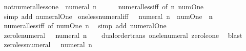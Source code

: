 \begin{isabellebody}
\isanewline
%
\endisadelimproof
\isanewline
{}\isamarkupfalse%
\ not{\isacharunderscore}{\kern0pt}numeral{\isacharunderscore}{\kern0pt}less{\isacharunderscore}{\kern0pt}one{\isacharcolon}{\kern0pt}\ {\isachardoublequoteopen}{\isasymnot}\ numeral\ n\ {\isacharless}{\kern0pt}\ {}{\isachardoublequoteclose}\isanewline
%
\isadelimproof
\ \ %
\endisadelimproof
%
\isatagproof
{}\isamarkupfalse%
\ numeral{\isacharunderscore}{\kern0pt}less{\isacharunderscore}{\kern0pt}iff\ {\isacharbrackleft}{\kern0pt}of\ n\ num{\isachardot}{\kern0pt}One{\isacharbrackright}{\kern0pt}\ \isamarkupfalse%
\ {\isacharparenleft}{\kern0pt}simp\ add{\isacharcolon}{\kern0pt}\ numeral{\isacharunderscore}{\kern0pt}One{\isacharparenright}{\kern0pt}%
\endisatagproof
{\isafoldproof}%
%
\isadelimproof
\isanewline
%
\endisadelimproof
\isanewline
{}\isamarkupfalse%
\ one{\isacharunderscore}{\kern0pt}less{\isacharunderscore}{\kern0pt}numeral{\isacharunderscore}{\kern0pt}iff{\isacharcolon}{\kern0pt}\ {\isachardoublequoteopen}{}\ {\isacharless}{\kern0pt}\ numeral\ n\ {\isasymlongleftrightarrow}\ num{\isachardot}{\kern0pt}One\ {\isacharless}{\kern0pt}\ n{\isachardoublequoteclose}\isanewline
%
\isadelimproof
\ \ %
\endisadelimproof
%
\isatagproof
{}\isamarkupfalse%
\ numeral{\isacharunderscore}{\kern0pt}less{\isacharunderscore}{\kern0pt}iff\ {\isacharbrackleft}{\kern0pt}of\ num{\isachardot}{\kern0pt}One\ n{\isacharbrackright}{\kern0pt}\ \isamarkupfalse%
\ {\isacharparenleft}{\kern0pt}simp\ add{\isacharcolon}{\kern0pt}\ numeral{\isacharunderscore}{\kern0pt}One{\isacharparenright}{\kern0pt}%
\endisatagproof
{\isafoldproof}%
%
\isadelimproof
\isanewline
%
\endisadelimproof
\isanewline
{}\isamarkupfalse%
\ zero{\isacharunderscore}{\kern0pt}le{\isacharunderscore}{\kern0pt}numeral{\isacharcolon}{\kern0pt}\ {\isachardoublequoteopen}{}\ {\isasymle}\ numeral\ n{\isachardoublequoteclose}\isanewline
%
\isadelimproof
\ \ %
\endisadelimproof
%
\isatagproof
{}\isamarkupfalse%
\ dual{\isacharunderscore}{\kern0pt}order{\isachardot}{\kern0pt}trans\ one{\isacharunderscore}{\kern0pt}le{\isacharunderscore}{\kern0pt}numeral\ zero{\isacharunderscore}{\kern0pt}le{\isacharunderscore}{\kern0pt}one\ \isamarkupfalse%
\ blast%
\endisatagproof
{\isafoldproof}%
%
\isadelimproof
\isanewline
%
\endisadelimproof
\isanewline
{}\isamarkupfalse%
\ zero{\isacharunderscore}{\kern0pt}less{\isacharunderscore}{\kern0pt}numeral{\isacharcolon}{\kern0pt}\ {\isachardoublequoteopen}{}\ {\isacharless}{\kern0pt}\ numeral\ n{\isachardoublequoteclose}\isanewline

\end{isabellebody}
